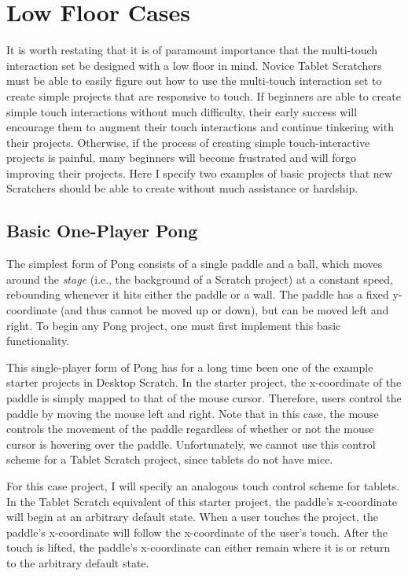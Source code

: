 \section{Low Floor Cases}
It is worth restating that it is of paramount importance that the multi-touch interaction set be designed with a low floor in mind. Novice Tablet Scratchers must be able to easily figure out how to use the multi-touch interaction set to create simple projects that are responsive to touch. If beginners are able to create simple touch interactions without much difficulty, their early success will encourage them to augment their touch interactions and continue tinkering with their projects. Otherwise, if the process of creating simple touch-interactive projects is painful, many beginners will become frustrated and will forgo improving their projects. Here I specify two examples of basic projects that new Scratchers should be able to create without much assistance or hardship.

\subsection{Basic One-Player Pong}
The simplest form of Pong consists of a single paddle and a ball, which moves around the \emph{stage} (i.e., the background of a Scratch project) at a constant speed, rebounding whenever it hits either the paddle or a wall. The paddle has a fixed y-coordinate (and thus cannot be moved up or down), but can be moved left and right. To begin any Pong project, one must first implement this basic functionality.

This single-player form of Pong has for a long time been one of the example starter projects in Desktop Scratch. In the starter project, the x-coordinate of the paddle is simply mapped to that of the mouse cursor. Therefore, users control the paddle by moving the mouse left and right. Note that in this case, the mouse controls the movement of the paddle regardless of whether or not the mouse cursor is hovering over the paddle. Unfortunately, we cannot use this control scheme for a Tablet Scratch project, since tablets do not have mice.

For this case project, I will specify an analogous touch control scheme for tablets. In the Tablet Scratch equivalent of this starter project, the paddle's x-coordinate will begin at an arbitrary default state. When a user touches the project, the paddle's x-coordinate will follow the x-coordinate of the user's touch. After the touch is lifted, the paddle's x-coordinate can either remain where it is or return to the arbitrary default state. 

